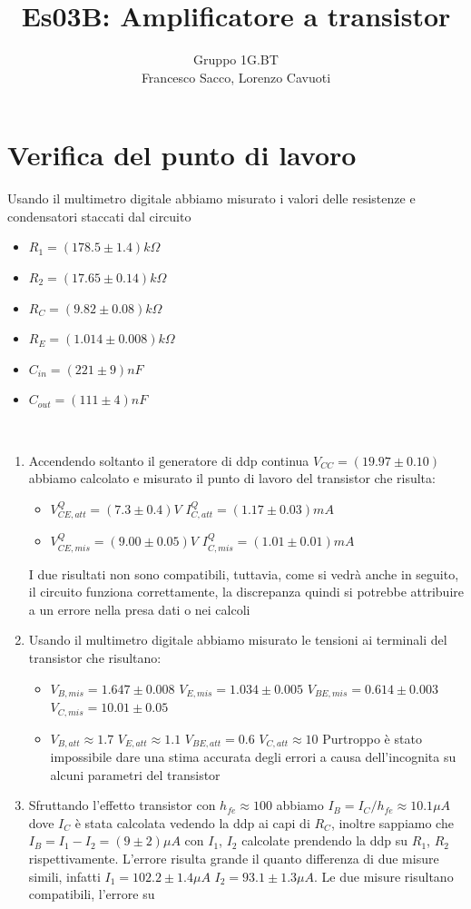 \documentclass[10pt,a4paper]{article}
\author{Gruppo 1G.BT \\ Francesco Sacco, Lorenzo Cavuoti}
\title{Es03B: Amplificatore a transistor}
\begin{document}
	\maketitle
	\section{Verifica del punto di lavoro}
	Usando il multimetro digitale abbiamo misurato i valori delle resistenze e condensatori staccati dal circuito
\begin{itemize}
\item $R_1=(178.5\pm1.4)k\Omega$ 
\item $R_2=(17.65\pm0.14)k\Omega$ 
\item $R_C=(9.82\pm0.08)k\Omega$ 
\item $R_E=(1.014\pm0.008)k\Omega$
\item $C_{in}=(221\pm9)nF$
\item $C_{out}=(111\pm4)nF$
\end{itemize}
\\
\begin{enumerate}
\item Accendendo soltanto il generatore di ddp continua $V_{CC}=(19.97\pm0.10)$ abbiamo calcolato e misurato il punto di lavoro del transistor che risulta:
\begin{itemize}
\item $V_{CE,att}^Q = (7.3\pm0.4)V$ $I_{C,att}^Q = (1.17\pm0.03)mA$
\item $V_{CE,mis}^Q = (9.00\pm0.05)V$ $ I_{C,mis}^Q = (1.01\pm0.01)mA$
\end{itemize}
I due risultati non sono compatibili, tuttavia, come si vedrà anche in seguito, il circuito funziona correttamente, la discrepanza quindi si potrebbe attribuire a un errore nella presa dati o nei calcoli

\item Usando il multimetro digitale abbiamo misurato le tensioni ai terminali del transistor che risultano:
\begin{itemize}
\item $V_{B,mis} = 1.647\pm0.008$ $V_{E,mis} = 1.034\pm 0.005$ $V_{BE,mis} = 0.614\pm0.003$ $V_{C,mis} = 10.01\pm0.05$
\item $V_{B,att} \approx 1.7$ $V_{E,att} \approx 1.1$ $V_{BE,att} = 0.6$ $V_{C,att} \approx 10$\newline
Purtroppo è stato impossibile dare una stima accurata degli errori a causa dell'incognita su alcuni parametri del transistor
\end{itemize}
\item Sfruttando l'effetto transistor con $h_{fe}\approx 100$ abbiamo $I_B = I_C/h_{fe} \approx 10.1 \mu A$ dove $I_C$ è stata calcolata vedendo la ddp ai capi di $R_C$, inoltre sappiamo che $I_B = I_1-I_2 = (9\pm2)\mu A$ con $I_1$, $I_2$ calcolate prendendo la ddp su $R_1$, $R_2$ rispettivamente. L'errore risulta grande il quanto differenza di due misure simili, infatti $I_1=102.2\pm1.4\mu A$ $I_2=93.1\pm1.3\mu A$. Le due misure risultano compatibili, l'errore su 
\end{enumerate}
	
\end{document}
